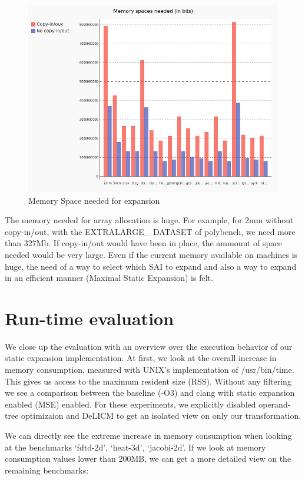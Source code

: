 \begin{figure}
\centering
\includegraphics[scale=0.4]{gfx/Evaluation/MemorySpace.png}
\caption{Memory Space needed for expansion}
\label{fig:MemorySpace}
\end{figure}

The memory needed for array allocation is huge. For example, for 2mm without copy-in/out, with the EXTRALARGE\_ DATASET of polybench, we need more than 327Mb. If copy-in/out would have been in place, the ammount of space needed would be very large. Even if the current memory available on machines is huge, the need of a way to select which SAI to expand and also a way to expand in an efficient manner (Maximal Static Expansion) is felt.

\section{Run-time evaluation}
We close up the evaluation with an overview over the execution behavior of our static expansion implementation. At first, we look at the overall increase in memory consumption, measured with UNIX’s implementation of /usr/bin/time. This gives us access to the maximum resident size (RSS). Without any filtering we see a comparison between the baseline (-O3) and clang with static expansion enabled (MSE) enabled. For these experiments, we explicitly disabled operand-tree optimizaion and DeLICM to get an isolated view on only our transformation.


We can directly see the extreme increase in memory consumption when looking at the benchmarks ‘fdtd-2d’, ‘heat-3d’, ‘jacobi-2d’. If we look at memory consumption values lower than 200MB, we can get a more detailed view on the remaining benchmarks: 

